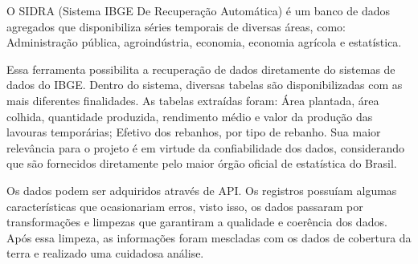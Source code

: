 O SIDRA (Sistema IBGE De Recuperação Automática) é um banco de dados agregados que disponibiliza séries temporais de diversas áreas, como: Administração pública, agroindústria, economia, economia agrícola e estatística.

Essa ferramenta possibilita a recuperação de dados diretamente do sistemas de dados do IBGE. Dentro do sistema, diversas tabelas são disponibilizadas com as mais diferentes finalidades. As tabelas extraídas foram: Área plantada, área colhida, quantidade produzida, rendimento médio e valor da produção das lavouras temporárias; Efetivo dos rebanhos, por tipo de rebanho. Sua maior relevância para o projeto é em virtude da confiabilidade dos dados, considerando que são fornecidos diretamente pelo maior órgão oficial de estatística do Brasil.

Os dados podem ser adquiridos através de API. Os registros possuíam algumas características que ocasionariam erros, visto isso, os dados passaram por transformações e limpezas que garantiram a qualidade e coerência dos dados. Após essa limpeza, as informações foram mescladas com os dados de cobertura da terra e realizado uma cuidadosa análise. 


